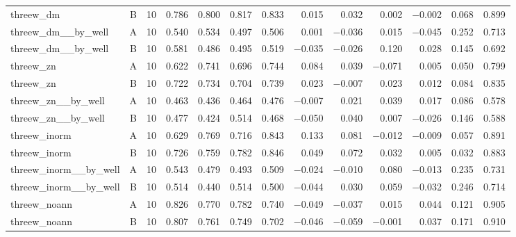 \begin{tabular}{@{}l c r rrrrrrrrrr@{}}
threew\_dm & B & 10 & 0.786 & 0.800 & 0.817 & 0.833 & 0.015 & 0.032 & 0.002 & $-$0.002 & 0.068 & 0.899 \\
threew\_dm\_\_by\_well & A & 10 & 0.540 & 0.534 & 0.497 & 0.506 & 0.001 & $-$0.036 & 0.015 & $-$0.045 & 0.252 & 0.713 \\
threew\_dm\_\_by\_well & B & 10 & 0.581 & 0.486 & 0.495 & 0.519 & $-$0.035 & $-$0.026 & 0.120 & 0.028 & 0.145 & 0.692 \\
threew\_zn & A & 10 & 0.622 & 0.741 & 0.696 & 0.744 & 0.084 & 0.039 & $-$0.071 & 0.005 & 0.050 & 0.799 \\
threew\_zn & B & 10 & 0.722 & 0.734 & 0.704 & 0.739 & 0.023 & $-$0.007 & 0.023 & 0.012 & 0.084 & 0.835 \\
threew\_zn\_\_by\_well & A & 10 & 0.463 & 0.436 & 0.464 & 0.476 & $-$0.007 & 0.021 & 0.039 & 0.017 & 0.086 & 0.578 \\
threew\_zn\_\_by\_well & B & 10 & 0.477 & 0.424 & 0.514 & 0.468 & $-$0.050 & 0.040 & 0.007 & $-$0.026 & 0.146 & 0.588 \\
threew\_inorm & A & 10 & 0.629 & 0.769 & 0.716 & 0.843 & 0.133 & 0.081 & $-$0.012 & $-$0.009 & 0.057 & 0.891 \\
threew\_inorm & B & 10 & 0.726 & 0.759 & 0.782 & 0.846 & 0.049 & 0.072 & 0.032 & 0.005 & 0.032 & 0.883 \\
threew\_inorm\_\_by\_well & A & 10 & 0.543 & 0.479 & 0.493 & 0.509 & $-$0.024 & $-$0.010 & 0.080 & $-$0.013 & 0.235 & 0.731 \\
threew\_inorm\_\_by\_well & B & 10 & 0.514 & 0.440 & 0.514 & 0.500 & $-$0.044 & 0.030 & 0.059 & $-$0.032 & 0.246 & 0.714 \\
threew\_noann & A & 10 & 0.826 & 0.770 & 0.782 & 0.740 & $-$0.049 & $-$0.037 & 0.015 & 0.044 & 0.121 & 0.905 \\
threew\_noann & B & 10 & 0.807 & 0.761 & 0.749 & 0.702 & $-$0.046 & $-$0.059 & $-$0.001 & 0.037 & 0.171 & 0.910 \\
\bottomrule
\end{tabular}
